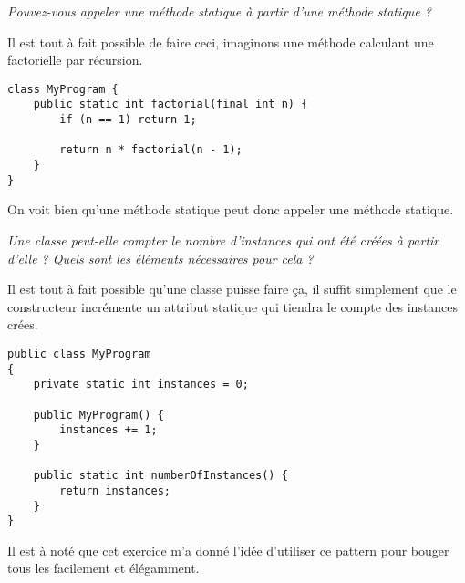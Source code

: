 \begin{exercise}[subtitle=test static]
\textit{Pouvez-vous appeler une méthode statique à partir d'une méthode statique ?}

Il est tout à fait possible de faire ceci, imaginons une méthode calculant une factorielle par récursion.

\begin{verbatim}
class MyProgram {
    public static int factorial(final int n) {
        if (n == 1) return 1;

        return n * factorial(n - 1);
    }
}
\end{verbatim}

On voit bien qu'une méthode statique peut donc appeler une méthode statique.

\end{exercise}

\begin{exercise}[subtitle=Nombre d'instances]

\textit{Une classe peut-elle compter le nombre d'instances qui ont été créées à partir d'elle ? Quels sont les éléments nécessaires pour cela ?}

Il est tout à fait possible qu'une classe puisse faire ça, il suffit simplement que le constructeur incrémente un attribut statique qui tiendra le compte des instances crées.

\begin{verbatim}
public class MyProgram
{
    private static int instances = 0;

    public MyProgram() {
        instances += 1;
    }

    public static int numberOfInstances() {
        return instances;
    }
}
\end{verbatim}

Il est à noté que cet exercice m'a donné l'idée d'utiliser ce pattern pour bouger tous les  facilement et élégamment.

\end{exercise}
